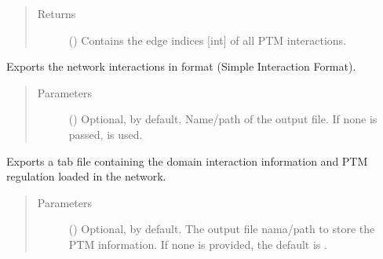 \documentclass[letterpaper,10pt,english]{sphinxmanual}
\begin{document}
\begin{fulllineitems}
\begin{fulllineitems}
\begin{quote}
\begin{description}
\item[{Returns}] \leavevmode
() \textendash{} Contains the edge indices {[}int{]} of all PTM
interactions.

\end{description}\end{quote}

\end{fulllineitems}


\begin{fulllineitems}
\label{\detokenize{reference:pypath.main.PyPath.export_sif}}
Exports the network interactions in  format (Simple
Interaction Format).
\begin{quote}\begin{description}
\item[{Parameters}] \leavevmode
{} () \textendash{} Optional,  by default. Name/path of the output file.
If none is passed, 
is used.

\end{description}\end{quote}

\end{fulllineitems}


\begin{fulllineitems}
\label{\detokenize{reference:pypath.main.PyPath.export_struct_tab}}
Exports a tab file containing the domain interaction information
and PTM regulation loaded in the network.
\begin{quote}\begin{description}
\item[{Parameters}] \leavevmode
{} () \textendash{} Optional,  by default. The output file nama/path to
store the PTM information. If none is provided, the default
is .


\end{description}
\end{quote}
\end{fulllineitems}
\end{fulllineitems}
\end{document}
